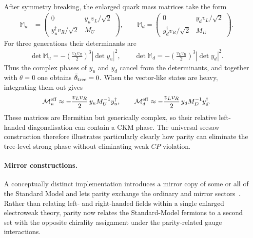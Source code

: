 \documentclass[review]{elsarticle}
\numberwithin{equation}{section}
\numberwithin{table}{section}
\numberwithin{figure}{section}
\def\M{\mathcal{M}}
\begin{document}
After symmetry breaking, the enlarged quark mass matrices take the form
\begin{align}
    \mathbb M_u
    &=
    \begin{pmatrix}
        0 & y_uv_L/\sqrt{2}\\
        y_u^\dagger v_R/\sqrt{2} & M_U
    \end{pmatrix},
    \qquad
    \mathbb M_d
    =
    \begin{pmatrix}
        0 & y_dv_L/\sqrt{2}\\
        y_d^\dagger v_R/\sqrt{2} & M_D
    \end{pmatrix}.
    \label{eq:parity-universal-seesaw-masses}
\end{align}
For three generations their determinants are
\begin{align}
    \det\mathbb M_u = -\left(\frac{v_Lv_R}{2}\right)^3
    |\det y_u|^2,
    \qquad
    \det\mathbb M_d = -\left(\frac{v_Lv_R}{2}\right)^3
    |\det y_d|^2.
    \label{eq:parity-universal-seesaw-determinant}
\end{align}
Thus the complex phases of $y_u$ and $y_d$ cancel from the determinants, and together with $\theta=0$ one obtains $\bar\theta_{\rm tree}=0$. When the vector-like states are heavy, integrating them out gives
\begin{align}
    \M_u^{\rm eff} \approx -\frac{v_Lv_R}{2}\, y_uM_U^{-1}y_u^\dagger, 
    \qquad
    \M_d^{\rm eff}\approx -\frac{v_Lv_R}{2}\, y_dM_D^{-1}y_d^\dagger. 
    \label{eq:parity-universal-seesaw-effective}
\end{align}
These matrices are Hermitian but generically complex, so their relative left-handed diagonalisation can contain a CKM phase. The universal-seesaw construction therefore illustrates particularly clearly how parity can eliminate the tree-level strong phase without eliminating weak $CP$ violation.

\paragraph{Mirror constructions.}

A conceptually distinct implementation introduces a mirror copy of some or all of the Standard Model and lets parity exchange the ordinary and mirror sectors~\cite{Barr:1991qx,Hall:2018let,Dunsky:2019api,Craig:2020bnv,Bonnefoy:2023afx}. Rather than relating left- and right-handed fields within a single enlarged electroweak theory, parity now relates the Standard-Model fermions to a second set with the opposite chirality assignment under the parity-related gauge interactions.
\end{document}
